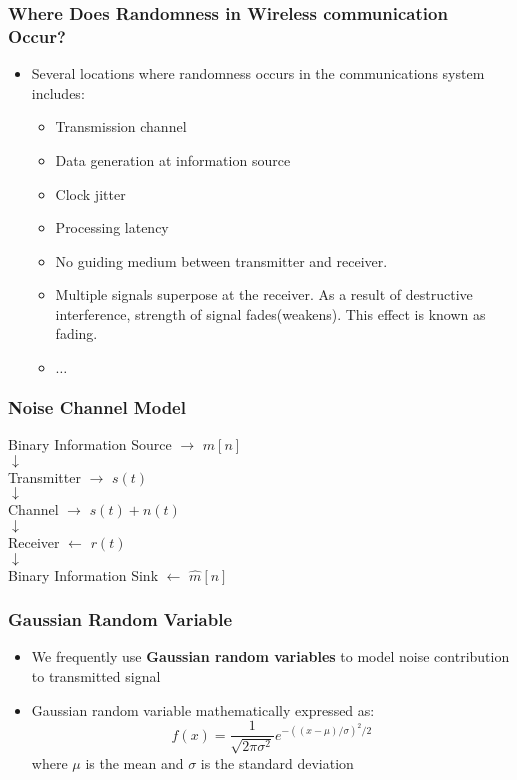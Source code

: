 \documentclass{beamer}
\begin{document}
\frame
{
  \frametitle{Where Does Randomness in Wireless communication Occur?}

  \begin{itemize}
   \item Several locations where randomness occurs in the communications system includes:
   \begin{itemize}
    \item Transmission channel
    \item Data generation at information source
    \item Clock jitter
    \item Processing latency
    \item No guiding medium between transmitter and receiver.\\
    \item Multiple signals superpose at the receiver. As a result of destructive interference, strength of signal fades(weakens). This effect is known as fading.
    \item $\ldots$
   \end{itemize}

  \end{itemize}


  }

\frame
{
  \frametitle{Noise Channel Model}
  
  \centering
  Binary Information Source $\rightarrow$ $m[n]$\\
  $\downarrow$\\
  Transmitter $\rightarrow$ $s(t)$\\
  $\downarrow$\\
  Channel $\rightarrow$ $s(t)+n(t)$\\
  $\downarrow$\\
  Receiver $\leftarrow$ $r(t)$\\
  $\downarrow$\\
  Binary Information Sink $\leftarrow$ $\hat{m}[n]$

}





\frame
{
  \frametitle{Gaussian Random Variable}
  
  \begin{itemize}
   \item We frequently use \textbf{Gaussian random variables} to model noise contribution to transmitted signal
   \item Gaussian random variable mathematically expressed as:
   \begin{equation}
    f(x)=\frac{1}{\sqrt{2\pi{\sigma^2}}}e^{-((x-\mu)/\sigma)^2/2}
   \end{equation}
   where $\mu$ is the mean and $\sigma$ is the standard deviation
  \end{itemize}

  
}
\end{document}
